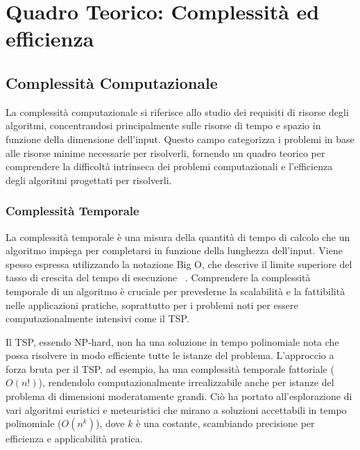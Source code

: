 
%

\chapter{Quadro Teorico: Complessità ed efficienza}\label{chapt:2}



\section{Complessità Computazionale}

La complessità computazionale si riferisce allo studio dei requisiti di risorse degli algoritmi, concentrandosi principalmente sulle risorse di tempo e spazio in funzione della dimensione dell'input. Questo campo categorizza i problemi in base alle risorse minime necessarie per risolverli, fornendo un quadro teorico per comprendere la difficoltà intrinseca dei problemi computazionali e l'efficienza degli algoritmi progettati per risolverli. ~\cite{GareyJohnson1979}

\subsection{Complessità Temporale}

La complessità temporale è una misura della quantità di tempo di calcolo che un algoritmo impiega per completarsi in funzione della lunghezza dell'input. Viene spesso espressa utilizzando la notazione Big O, che descrive il limite superiore del tasso di crescita del tempo di esecuzione ~\cite{BigONotation}. Comprendere la complessità temporale di un algoritmo è cruciale per prevederne la scalabilità e la fattibilità nelle applicazioni pratiche, soprattutto per i problemi noti per essere computazionalmente intensivi come il \Gls{TSP}. 

Il \Gls{TSP}, essendo \Gls{NP}-hard, non ha una soluzione in tempo polinomiale nota che possa risolvere in modo efficiente tutte le istanze del problema. L'approccio a forza bruta per il \Gls{TSP}, ad esempio, ha una complessità temporale fattoriale (\(O(n!)\)), rendendolo computazionalmente irrealizzabile anche per istanze del problema di dimensioni moderatamente grandi. Ciò ha portato all'esplorazione di vari algoritmi euristici e meteuristici che mirano a soluzioni accettabili in tempo polinomiale (\(O(n^k)\)), dove \(k\) è una costante, scambiando precisione per efficienza e applicabilità pratica.~\cite{Dorigo1996}


